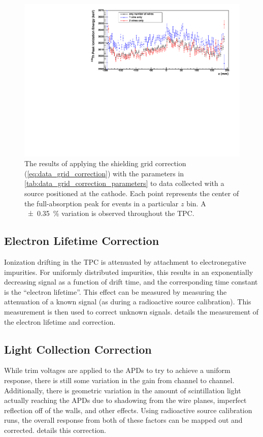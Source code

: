 \documentclass[herrin-thesis.tex]{subfiles}
\begin{document}
\begin{figure}[htbp]
\centering
\includegraphics[width=\textwidth]{./plots/data_grid_correction_applied.pdf}
\caption[The result of applying the shielding grid correction to data]{The results of applying the shielding grid correction (\cref{eq:data_grid_correction}) with the parameters in \cref{tab:data_grid_correction_parameters} to data collected with a  source positioned at the cathode.  Each point represents the center of the full-absorption peak for events in a particular \(z\) bin. A \SI{\pm0.35}{\percent} variation is observed throughout the TPC.}
	\label{fig:data_grid_correction_applied}
\end{figure}

\subsection{Electron Lifetime Correction}
Ionization drifting in the TPC is attenuated by attachment to electronegative impurities. For uniformly distributed impurities, this results in an exponentially decreasing signal as a function of drift time, and the corresponding time constant is the ``electron lifetime''. This effect can be measured by measuring the attenuation of a known signal (as during a radioactive source calibration). This measurement is then used to correct unknown signals.  details the measurement of the electron lifetime and correction.

\subsection{Light Collection Correction}
While trim voltages are applied to the APDs to try to achieve a uniform response, there is still some variation in the gain from channel to channel. Additionally, there is geometric variation in the amount of scintillation light actually reaching the APDs due to shadowing from the wire planes, imperfect reflection off of the walls, and other effects. Using radioactive source calibration runs, the overall response from both of these factors can be mapped out and corrected.  details this correction.
\end{document}
